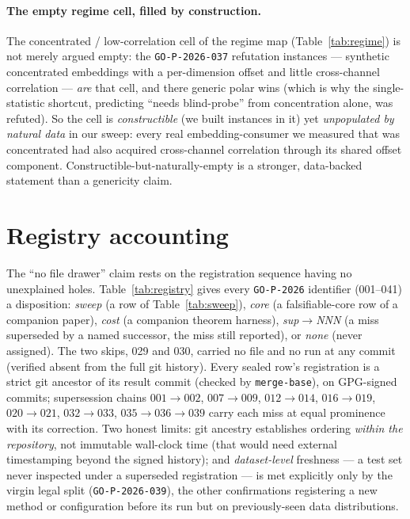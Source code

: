 \documentclass[10pt]{article} %
\theoremstyle{remark}
\newcommand{\seal}[1]{\texttt{GO-P-2026-#1}}
\begin{document}
\paragraph{The empty regime cell, filled by construction.} The concentrated /
low-correlation cell of the regime map (Table~\ref{tab:regime}) is not merely argued empty:
the \seal{037} refutation instances --- synthetic concentrated embeddings with a per-dimension
offset and little cross-channel correlation --- \emph{are} that cell, and there generic polar
wins (which is why the single-statistic shortcut, predicting ``needs blind-probe'' from
concentration alone, was refuted). So the cell is \emph{constructible} (we built instances in
it) yet \emph{unpopulated by natural data} in our sweep: every real embedding-consumer we
measured that was concentrated had also acquired cross-channel correlation through its shared
offset component. Constructible-but-naturally-empty is a stronger, data-backed statement than
a genericity claim.

\section{Registry accounting}\label{app:registry}
The ``no file drawer'' claim rests on the registration sequence having no unexplained holes.
Table~\ref{tab:registry} gives every \texttt{GO-P-2026} identifier (001--041) a disposition:
\emph{sweep} (a row of Table~\ref{tab:sweep}), \emph{core} (a falsifiable-core row of a
companion paper), \emph{cost} (a companion theorem harness), \emph{sup$\to$NNN} (a miss
superseded by a named successor, the miss still reported), or \emph{none} (never assigned).
The two skips, 029 and 030, carried no file and no run at any commit (verified absent from
the full git history). Every sealed row's registration is a strict git ancestor of its
result commit (checked by \texttt{merge-base}), on GPG-signed commits; supersession chains
$001{\to}002$, $007{\to}009$, $012{\to}014$, $016{\to}019$, $020{\to}021$, $032{\to}033$,
$035{\to}036{\to}039$ carry each miss at equal prominence with its correction. Two honest
limits: git ancestry establishes ordering \emph{within the repository}, not immutable
wall-clock time (that would need external timestamping beyond the signed history); and
\emph{dataset-level} freshness --- a test set never inspected under a superseded
registration --- is met explicitly only by the virgin legal split (\seal{039}), the other
confirmations registering a new method or configuration before its run but on
previously-seen data distributions.
\end{document}
